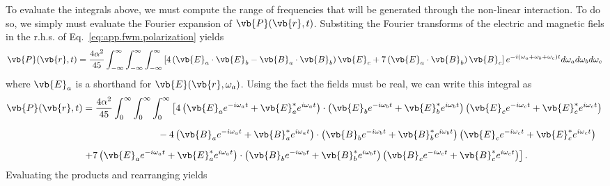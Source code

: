 \documentclass[11pt,SymmetricalJury]{inrsthesis/inrsthesis}
\begin{document}
To evaluate the integrals above, we must compute the range of frequencies
that will be generated through the non-linear interaction. To do so,
we simply must evaluate the Fourier expansion of $\vb{P}(\vb{r},t)$.
Substiting the Fourier transforms of the electric and magnetic fiels in
the r.h.s. of Eq.~\eqref{eq:app.fwm.polarization} yields
  \begin{equation}
    \vb{P}(\vb{r},t) = \frac{4\alpha^2}{45}\int_{-\infty}^\infty\int_{-\infty}^\infty\int_{-\infty}^\infty
                        \left[
                          4\left(\vb{E}_a\cdot\vb{E}_b-\vb{B}_a\cdot\vb{B}_b\right)\vb{E}_c
                         +7\left(\vb{E}_a\cdot\vb{B}_b\right)\vb{B}_c
                        \right]e^{-i(\omega_a+\omega_b+\omega_c)t}d\omega_ad\omega_bd\omega_c
  \end{equation}
where $\vb{E}_a$ is a shorthand for $\vb{E}(\vb{r},\omega_a)$. Using the fact
the fields must be real, we can write this integral as
  \begin{align}
    \vb{P}(\vb{r},t)
        &= \frac{4\alpha^2}{45}\int_0^\infty\int_0^\infty\int_0^\infty
            \left[
              4\left(\vb{E}_ae^{-i\omega_a t}+\vb{E}_a^*e^{i\omega_a t}\right)
          \cdot\left(\vb{E}_be^{-i\omega_b t}+\vb{E}_b^*e^{i\omega_b t}\right)
               \left(\vb{E}_ce^{-i\omega_c t}+\vb{E}_c^*e^{i\omega_c t}\right)
            \right. \nonumber\\
        &\phantom{\frac{4\alpha^2}{45}\int_0^\infty\int_0^\infty\int_0^\infty}
             -4\left(\vb{B}_ae^{-i\omega_a t}+\vb{B}_a^*e^{i\omega_a t}\right)
          \cdot\left(\vb{B}_be^{-i\omega_b t}+\vb{B}_b^*e^{i\omega_b t}\right)
               \left(\vb{E}_ce^{-i\omega_c t}+\vb{E}_c^*e^{i\omega_c t}\right)
            \nonumber\\
        &\left.
             +7\left(\vb{E}_ae^{-i\omega_a t}+\vb{E}_a^*e^{i\omega_a t}\right)
          \cdot\left(\vb{B}_be^{-i\omega_b t}+\vb{B}_b^*e^{i\omega_b t}\right)
               \left(\vb{B}_ce^{-i\omega_c t}+\vb{B}_c^*e^{i\omega_c t}\right)
          \right].
  \end{align}
Evaluating the products and rearranging yields
\end{document}
